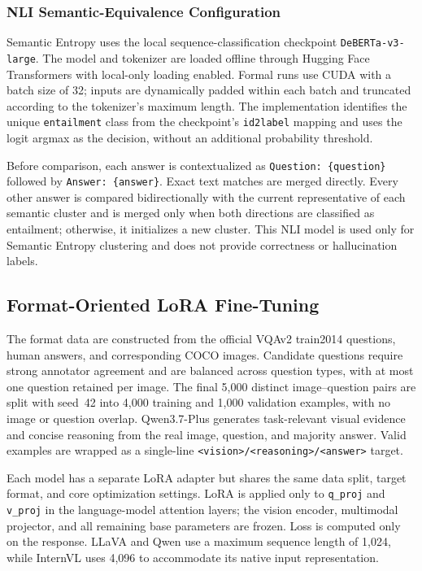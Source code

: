 \subsubsection{NLI Semantic-Equivalence Configuration}
\label{subsubsec:appendix_nli_config}

Semantic Entropy uses the local sequence-classification checkpoint \texttt{DeBERTa-v3-large}. The model and tokenizer are loaded offline through Hugging Face Transformers with local-only loading enabled. Formal runs use CUDA with a batch size of 32; inputs are dynamically padded within each batch and truncated according to the tokenizer's maximum length. The implementation identifies the unique \texttt{entailment} class from the checkpoint's \texttt{id2label} mapping and uses the logit argmax as the decision, without an additional probability threshold.

Before comparison, each answer is contextualized as \texttt{Question: \{question\}} followed by \texttt{Answer: \{answer\}}. Exact text matches are merged directly. Every other answer is compared bidirectionally with the current representative of each semantic cluster and is merged only when both directions are classified as entailment; otherwise, it initializes a new cluster. This NLI model is used only for Semantic Entropy clustering and does not provide correctness or hallucination labels.

\subsection{Format-Oriented LoRA Fine-Tuning}
\label{subsec:appendix_lora}

The format data are constructed from the official VQAv2 train2014 questions, human answers, and corresponding COCO images. Candidate questions require strong annotator agreement and are balanced across question types, with at most one question retained per image. The final 5,000 distinct image--question pairs are split with seed~42 into 4,000 training and 1,000 validation examples, with no image or question overlap. Qwen3.7-Plus generates task-relevant visual evidence and concise reasoning from the real image, question, and majority answer. Valid examples are wrapped as a single-line \texttt{<vision>/<reasoning>/<answer>} target.

Each model has a separate LoRA adapter but shares the same data split, target format, and core optimization settings. LoRA is applied only to \texttt{q\_proj} and \texttt{v\_proj} in the language-model attention layers; the vision encoder, multimodal projector, and all remaining base parameters are frozen. Loss is computed only on the response. LLaVA and Qwen use a maximum sequence length of 1,024, while InternVL uses 4,096 to accommodate its native input representation.

